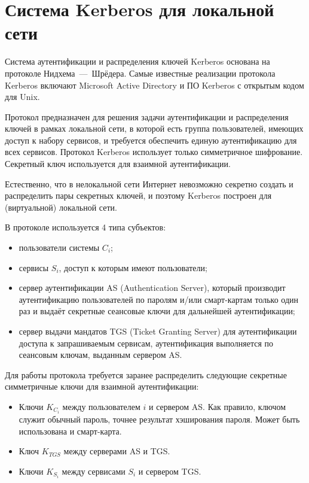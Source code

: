\section{Система Kerberos для локальной сети}

Система аутентификации и распределения ключей Kerberos основана на протоколе Нидхема~---~Шрёдера. Самые известные реализации протокола Kerberos включают Microsoft Active Directory и ПО Kerberos с открытым кодом для Unix.

Протокол предназначен для решения задачи аутентификации и распределения ключей в рамках локальной сети, в которой есть группа пользователей, имеющих доступ к набору сервисов, и требуется обеспечить единую аутентификацию для всех сервисов. Протокол Kerberos использует только симметричное шифрование. Секретный ключ используется для взаимной аутентификации.

Естественно, что в нелокальной сети Интернет невозможно секретно создать и распределить пары секретных ключей, и поэтому Kerberos построен для (виртуальной) локальной сети.

В протоколе используется 4 типа субъектов:

\begin{itemize}
    \item пользователи системы $C_i$;
    \item сервисы $S_i$, доступ к которым имеют пользователи;
    \item сервер аутентификации AS (Authentication Server), который производит аутентификацию пользователей по паролям и/или смарт-картам только один раз и выдаёт секретные сеансовые ключи для дальнейшей аутентификации;
    \item сервер выдачи мандатов TGS (Ticket Granting Server) для аутентификации доступа к запрашиваемым сервисам, аутентификация выполняется по сеансовым ключам, выданным сервером AS.
\end{itemize}

Для работы протокола требуется заранее распределить следующие секретные симметричные ключи для взаимной аутентификации:
\begin{itemize}
    \item Ключи $K_{C_i}$ между пользователем $i$ и сервером AS. Как правило, ключом служит обычный пароль, точнее результат хэширования пароля. Может быть использована и смарт-карта.
    \item Ключ $K_{TGS}$ между серверами AS и TGS.
    \item Ключи $K_{S_i}$ между сервисами $S_i$ и сервером TGS.
\end{itemize}

